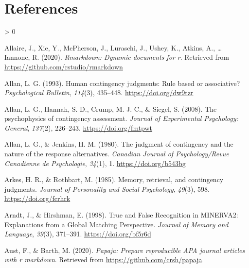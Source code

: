 \documentclass[
  english,
  man,floatsintext]{apa6}
\newlength{\cslhangindent}
\newenvironment{CSLReferences}[2] %
 {%
  \setlength{\parindent}{0pt}
  \ifodd #1 \everypar{\setlength{\hangindent}{\cslhangindent}}\ignorespaces\fi
  \ifnum #2 > 0
  \setlength{\parskip}{#2\baselineskip}
  \fi
 }%
 {}
\begin{document}
\newpage

\hypertarget{references}{%
\section{References}\label{references}}

\begingroup
\setlength{\parindent}{-0.5in}
\setlength{\leftskip}{0.5in}

\hypertarget{refs}{}
\begin{CSLReferences}{1}{0}
\leavevmode\hypertarget{ref-R-rmarkdown}{}%
Allaire, J., Xie, Y., McPherson, J., Luraschi, J., Ushey, K., Atkins, A., \ldots{} Iannone, R. (2020). \emph{Rmarkdown: Dynamic documents for r}. Retrieved from \url{https://github.com/rstudio/rmarkdown}

\leavevmode\hypertarget{ref-allanHumanContingencyJudgments1993}{}%
Allan, L. G. (1993). Human contingency judgments: {Rule} based or associative? \emph{Psychological Bulletin}, \emph{114}(3), 435--448. \url{https://doi.org/dw9tzr}

\leavevmode\hypertarget{ref-allanPsychophysicsContingencyAssessment2008}{}%
Allan, L. G., Hannah, S. D., Crump, M. J. C., \& Siegel, S. (2008). The psychophysics of contingency assessment. \emph{Journal of Experimental Psychology: General}, \emph{137}(2), 226--243. \url{https://doi.org/fmtpwt}

\leavevmode\hypertarget{ref-allanJudgmentContingencyNature1980}{}%
Allan, L. G., \& Jenkins, H. M. (1980). The judgment of contingency and the nature of the response alternatives. \emph{Canadian Journal of Psychology/Revue Canadienne de Psychologie}, \emph{34}(1), 1. \url{https://doi.org/b543bg}

\leavevmode\hypertarget{ref-arkesMemoryRetrievalContingency1985}{}%
Arkes, H. R., \& Rothbart, M. (1985). Memory, retrieval, and contingency judgments. \emph{Journal of Personality and Social Psychology}, \emph{49}(3), 598. \url{https://doi.org/fcrhrk}

\leavevmode\hypertarget{ref-arndtTrueFalseRecognition1998}{}%
Arndt, J., \& Hirshman, E. (1998). True and {False Recognition} in {MINERVA2}: {Explanations} from a {Global Matching Perspective}. \emph{Journal of Memory and Language}, \emph{39}(3), 371--391. \url{https://doi.org/bf5r6d}

\leavevmode\hypertarget{ref-R-papaja}{}%
Aust, F., \& Barth, M. (2020). \emph{Papaja: Prepare reproducible APA journal articles with r markdown}. Retrieved from \url{https://github.com/crsh/papaja}


\end{CSLReferences}
\end{document}
